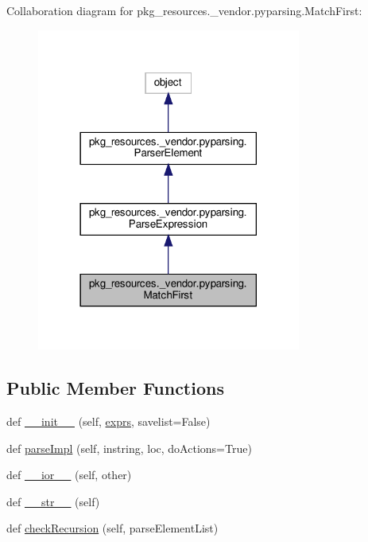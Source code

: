 Collaboration diagram for pkg\+\_\+resources.\+\_\+vendor.\+pyparsing.\+Match\+First\+:
\nopagebreak
\begin{figure}[H]
\begin{center}
\leavevmode
\includegraphics[width=246pt]{classpkg__resources_1_1__vendor_1_1pyparsing_1_1MatchFirst__coll__graph}
\end{center}
\end{figure}
\subsection*{Public Member Functions}
\begin{DoxyCompactItemize}
\item 
def \hyperlink{classpkg__resources_1_1__vendor_1_1pyparsing_1_1MatchFirst_acc3d30ea535be38efbcf99066d89209c}{\+\_\+\+\_\+init\+\_\+\+\_\+} (self, \hyperlink{classpkg__resources_1_1__vendor_1_1pyparsing_1_1ParseExpression_ae9e07a06d183190717e964e7ff907363}{exprs}, savelist=False)
\item 
def \hyperlink{classpkg__resources_1_1__vendor_1_1pyparsing_1_1MatchFirst_ae9b2ce37fba253237d80615c98f71b5f}{parse\+Impl} (self, instring, loc, do\+Actions=True)
\item 
def \hyperlink{classpkg__resources_1_1__vendor_1_1pyparsing_1_1MatchFirst_a685ce1ceb8cb54316cced1e61638a85b}{\+\_\+\+\_\+ior\+\_\+\+\_\+} (self, other)
\item 
def \hyperlink{classpkg__resources_1_1__vendor_1_1pyparsing_1_1MatchFirst_a2de89959b1bde892b75753caad1789ee}{\+\_\+\+\_\+str\+\_\+\+\_\+} (self)
\item 
def \hyperlink{classpkg__resources_1_1__vendor_1_1pyparsing_1_1MatchFirst_addab39b620dc0ddd580d497248827dd3}{check\+Recursion} (self, parse\+Element\+List)
\end{DoxyCompactItemize}

